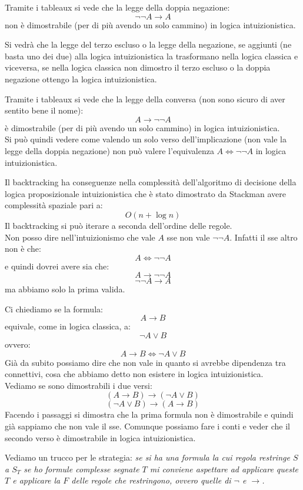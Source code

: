 \documentclass[a4paper,12pt, oneside]{book}
\begin{document}
\begin{esempio}
  Tramite i tableaux si vede che la legge della doppia negazione:
  \[\neg\neg A\to A\]
  non è dimostrabile (per di più avendo un solo cammino) in logica
  intuizionistica. 
\end{esempio}
Si vedrà che la legge del terzo escluso o la legge della negazione, se aggiunti
(ne basta uno dei due)
alla logica intuizionistica la trasformano nella logica classica e viceversa, se
nella logica classica non dimostro il terzo escluso o la doppia negazione
ottengo la logica intuizionistica.
\begin{esempio}
  Tramite i tableaux si vede che la legge della conversa (non sono sicuro di
  aver sentito bene il nome):
  \[A\to \neg\neg A\]
  è dimostrabile (per di più avendo un solo cammino) in logica
  intuizionistica. \\ 
  Si può quindi vedere come valendo un solo verso dell'implicazione (non vale la
  legge della doppia negazione) non può valere l'equivalenza $A\iff\neg \neg A$
  in logica intuizionistica.
\end{esempio}
Il backtracking ha conseguenze nella complessità dell'algoritmo di decisione
della logica proposizionale intuizionistica che è stato dimostrato da Stackman
avere complessità spaziale pari a: 
\[O(n+\log n)\]
Il backtracking si può iterare a seconda dell'ordine delle regole.\\
Non posso dire nell'intuizionismo che vale $A$ sse non vale $\neg\neg
A$. Infatti il sse altro non è che:
\[A\iff\neg \neg A\]
e quindi dovrei avere sia che:
\[A\to\neg \neg A\]
\[\neg \neg A\to A\]
ma abbiamo solo la prima valida.
\begin{esempio}
  Ci chiediamo se la formula:
  \[A\to B\]
  equivale, come in logica classica, a:
  \[\neg A\lor B\]
  ovvero:
  \[A\to B\iff \neg A\lor B\]
  Già da subito possiamo dire che non vale in quanto si avrebbe dipendenza tra
  connettivi, cosa che abbiamo detto non esistere in logica intuizionistica.\\
  Vediamo se sono dimostrabili i due versi:
  \[(A\to B)\to(\neg A\lor B)\]
  \[(\neg A\lor B)\to(A\to B)\]
  Facendo i passaggi si dimostra che la prima formula non è dimostrabile e
  quindi già sappiamo che non vale il sse. Comunque possiamo fare i conti e
  veder che il secondo verso è dimostrabile in logica intuizionistica.
\end{esempio}
\noindent
Vediamo un trucco per le strategia:
\textit{se si ha una formula la cui regola restringe $S$ a $S_T$ se ho formule
complesse segnate $T$ mi conviene aspettare ad applicare queste $T$ e
applicare la $F$ delle regole che restringono, ovvero quelle di $\neg$ e
$\to$.}\\
\end{document}
